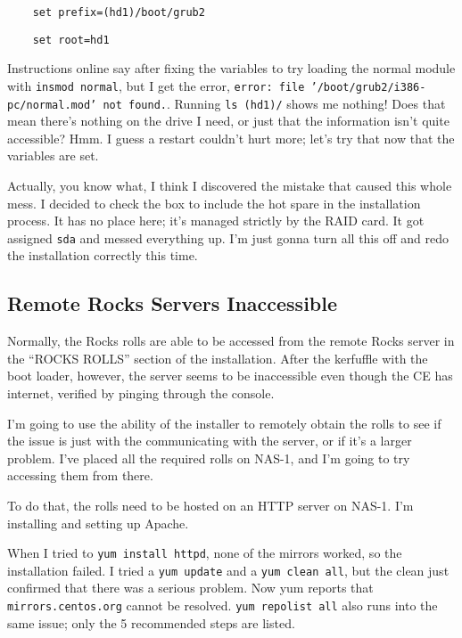 \documentclass[12pt]{article}
\begin{document}
\begin{tcolorbox}[colback=white, colframe=black]
  \begin{verbatim}
    set prefix=(hd1)/boot/grub2
  \end{verbatim}
  \begin{verbatim}
    set root=hd1
  \end{verbatim}
\end{tcolorbox}

\qq Instructions online say after fixing the variables to try loading the normal
module with {\tt insmod normal}, but I get the error, {\tt error: file
  '/boot/grub2/i386-pc/normal.mod' not found.}. Running {\tt ls (hd1)/} shows me
nothing! Does that mean there's nothing on the drive I need, or just that the
information isn't quite accessible? Hmm. I guess a restart couldn't hurt more;
let's try that now that the variables are set.

\begin{tcolorbox}[title=RESOLUTION, colback=white, colframe=green!40!black]
  Actually, you know what, I think I discovered the mistake that caused this
  whole mess. I decided to check the box to include the hot spare in the
  installation process. It has no place here; it's managed strictly by the RAID
  card. It got assigned {\tt sda} and messed everything up. I'm just gonna turn all
  this off and redo the installation correctly this time.
\end{tcolorbox}

\subsection{Remote Rocks Servers Inaccessible}

\qq Normally, the Rocks rolls are able to be accessed from the remote Rocks
server in the ``ROCKS ROLLS'' section of the installation. After the kerfuffle
with the boot loader, however, the server seems to be inaccessible even though
the CE has internet, verified by pinging through the console.

\qq I'm going to use the ability of the installer to remotely obtain the rolls
to see if the issue is just with the communicating with the server, or if it's a
larger problem. I've placed all the required rolls on NAS-1, and I'm going to
try accessing them from there.

\qq To do that, the rolls need to be hosted on an HTTP server on NAS-1. I'm
installing and setting up Apache.

\qq When I tried to {\tt yum install httpd}, none of the mirrors worked, so the
installation failed. I tried a {\tt yum update} and a {\tt yum clean all}, but the
clean just confirmed that there was a serious problem. Now yum reports that
{\tt mirrors.centos.org} cannot be resolved. {\tt yum repolist all} also runs into
the same issue; only the 5 recommended steps are listed.
\end{document}
